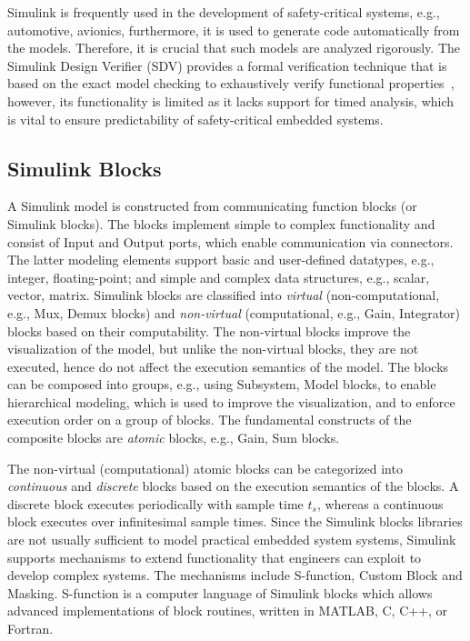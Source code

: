 Simulink is frequently used in the development of safety-critical systems, e.g., automotive, avionics, furthermore, it is used to generate code automatically from the models. Therefore, it is crucial that such models are analyzed rigorously. The Simulink Design Verifier (SDV) provides a formal verification technique that is based on the exact model checking to exhaustively verify functional properties~\cite{MathWokrksSimulinkVerifier}, however, its functionality is limited as it lacks support for timed analysis, which is vital to ensure predictability of safety-critical embedded systems. 

\subsection*{Simulink Blocks}
A Simulink model is constructed from communicating function blocks (or Simulink blocks). The blocks implement simple to complex functionality and consist of Input and Output ports, which enable communication via connectors. The latter modeling elements support basic and user-defined datatypes, e.g., integer, floating-point; and simple and complex data structures, e.g., scalar, vector, matrix.  Simulink blocks are classified into \textit{virtual} (non-computational, e.g., Mux, Demux blocks) and \textit{non-virtual} (computational, e.g., Gain, Integrator) blocks based on their computability. The non-virtual blocks improve the visualization of the model, but unlike the non-virtual blocks, they are not executed, hence do not affect the execution semantics of the model.  The blocks can be composed into groups, e.g., using Subsystem, Model blocks, to enable hierarchical modeling, which is used to improve the visualization, and to enforce execution order on a group of blocks. The fundamental constructs of the composite blocks are \textit{atomic} blocks, e.g., Gain, Sum blocks.

The non-virtual (computational) atomic blocks can be categorized into \textit{continuous} and \textit{discrete} blocks based on the execution semantics of the blocks.  A discrete block executes periodically with sample time $t_s$, whereas a continuous block executes over infinitesimal sample times. Since the Simulink blocks libraries are not usually sufficient to model practical embedded system systems, Simulink supports mechanisms to extend functionality that engineers can exploit to develop complex systems. The mechanisms include S-function, Custom Block and Masking. S-function is a computer language of Simulink blocks which allows advanced implementations of block routines, written in MATLAB, C, C++, or Fortran.


